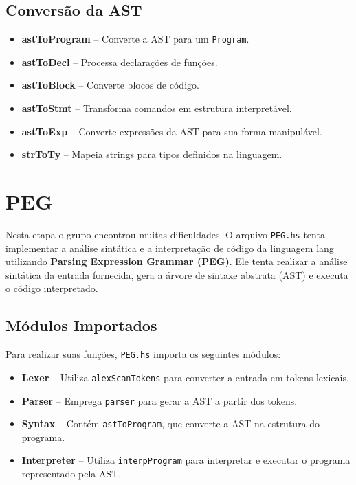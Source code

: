 \documentclass{article}
\begin{document}
\subsection{Conversão da AST}
\begin{itemize}
    \item \textbf{astToProgram} – Converte a AST para um \texttt{Program}.
    \item \textbf{astToDecl} – Processa declarações de funções.
    \item \textbf{astToBlock} – Converte blocos de código.
    \item \textbf{astToStmt} – Transforma comandos em estrutura interpretável.
    \item \textbf{astToExp} – Converte expressões da AST para sua forma manipulável.
    \item \textbf{strToTy} – Mapeia strings para tipos definidos na linguagem.
\end{itemize}


\section{PEG}
Nesta etapa o grupo encontrou muitas dificuldades. O arquivo \texttt{PEG.hs} tenta implementar a análise sintática e a interpretação de código da linguagem lang utilizando \textbf{Parsing Expression Grammar (PEG)}. Ele tenta realizar a análise sintática da entrada fornecida, gera a árvore de sintaxe abstrata (AST) e executa o código interpretado.

\subsection{Módulos Importados}
Para realizar suas funções, \texttt{PEG.hs} importa os seguintes módulos:
\begin{itemize}
    \item \textbf{Lexer} – Utiliza \texttt{alexScanTokens} para converter a entrada em tokens lexicais.
    \item \textbf{Parser} – Emprega \texttt{parser} para gerar a AST a partir dos tokens.
    \item \textbf{Syntax} – Contém \texttt{astToProgram}, que converte a AST na estrutura do programa.
    \item \textbf{Interpreter} – Utiliza \texttt{interpProgram} para interpretar e executar o programa representado pela AST.
\end{itemize}
\end{document}
